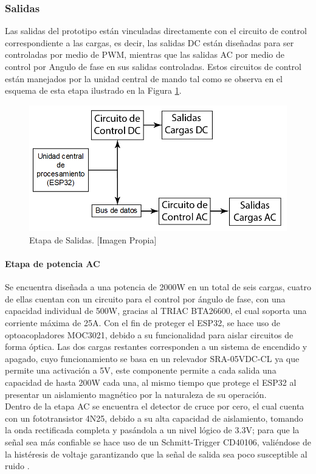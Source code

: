 	\subsubsection{Salidas}
	
	Las salidas del prototipo están vinculadas directamente con el circuito de control correspondiente a las cargas, es decir, las salidas DC están diseñadas para ser controladas por medio de PWM, mientras que las salidas AC por medio de control por Angulo de fase en sus salidas controladas. Estos circuitos de control están manejados por la unidad central de mando tal como se observa en el esquema de esta etapa ilustrado en la Figura \ref{fig:BSalidas}.\\ 
	
	\begin{figure}[!t]
		\centering
		\caption[Etapa de Salidas.]{Etapa de Salidas. [Imagen Propia]}
		\label{fig:BSalidas}
		\includegraphics[width=0.7\linewidth]{Imagenes/B_Salidas}
	\end{figure}	
	
	\paragraph{Etapa de potencia AC}
		Se encuentra diseñada a una potencia de 2000W en un total de seis cargas, cuatro de ellas cuentan con un circuito para el control por ángulo de fase, con una capacidad individual de 500W, gracias al TRIAC BTA26600, el cual soporta una corriente máxima de 25A. Con el fin de proteger el ESP32, se hace uso de optoacopladores MOC3021, debido a su funcionalidad para aislar circuitos de forma óptica. Las dos cargas restantes corresponden a un sistema de encendido y apagado, cuyo funcionamiento se basa en un relevador SRA-05VDC-CL ya que permite una activación a 5V, este componente permite a cada salida una capacidad de hasta 200W cada una, al mismo tiempo que protege el ESP32 al presentar un aislamiento magnético por la naturaleza de su operación.\\
	
		Dentro de la etapa AC se encuentra el detector de cruce por cero, el cual cuenta con un fototransistor 4N25, debido a su alta capacidad de aislamiento, tomando la onda rectificada completa y pasándola a un nivel lógico de 3.3V; para que la señal sea más confiable se hace uso de un Schmitt-Trigger CD40106, valiéndose de la histéresis de voltaje garantizando que la señal de salida sea poco susceptible al ruido \cite{DC0}.
	
